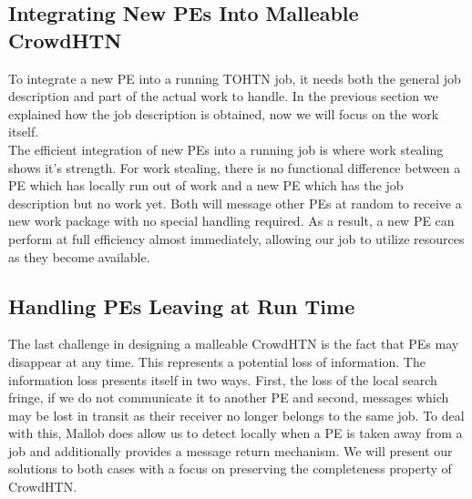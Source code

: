 \subsection{Integrating New PEs Into Malleable CrowdHTN}
To integrate a new PE into a running TOHTN job, it needs both the general job description and part of the actual work to handle. In the previous section we explained how the job description is obtained, now we will focus on the work itself. \\
The efficient integration of new PEs into a running job is where work stealing shows it's strength. For work stealing, there is no functional difference between a PE which has locally run out of work and a new PE which has the job description but no work yet. Both will message other PEs at random to receive a new work package with no special handling required. As a result, a new PE can perform at full efficiency almost immediately, allowing our job to utilize resources as they become available.
\begin{comment}
- work stealing makes this easy
- there is functionally no difference between a new PE and a PE which has locally run out of work
- no special handling required at all

- only setup work: parsing, initiating heuristic
- CrowdHTN may be less efficient, but can work immediately, make use of very short-lived PEs
\end{comment}

\subsection{Handling PEs Leaving at Run Time}
The last challenge in designing a malleable CrowdHTN is the fact that PEs may disappear at any time. This represents a potential loss of information. The information loss presents itself in two ways. First, the loss of the local search fringe, if we do not communicate it to another PE and second, messages which may be lost in transit as their receiver no longer belongs to the same job. To deal with this, Mallob does allow us to detect locally when a PE is taken away from a job and additionally provides a message return mechanism. We will present our solutions to both cases with a focus on preserving the completeness property of CrowdHTN.

